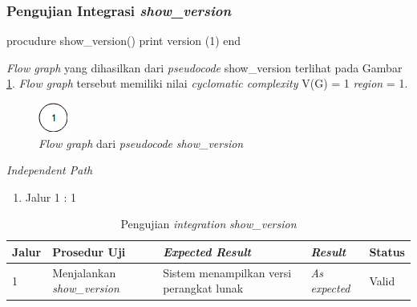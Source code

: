 \subsubsection{Pengujian Integrasi \emph{show\_version}}

\begin{code}
\begin{ignasicblock}[title=show\_version,minted language=text]
procudure show_version()
    print version         (1)
end
\end{ignasicblock}
  \label{pc:show_version}
\end{code}

\par\null\par
\noindent
\emph{Flow graph} yang dihasilkan dari \emph{pseudocode}
show\_version terlihat pada Gambar \ref{cfg:show_version}.
\emph{Flow graph} tersebut memiliki nilai \emph{cyclomatic complexity} V(G) = 1 \emph{region} = 1.

\begin{figure}[H]
  \centering
  \includegraphics[width=.06\linewidth]{img/test-case/1node}
  \caption{\emph{Flow graph} dari \emph{pseudocode} \emph{show\_version}}
  \label{cfg:show_version}
\end{figure}

\noindent
\emph{Independent Path}

\begin{enumerate}
\item Jalur 1 : 1
\end{enumerate}

\newpage

\begin{longtable}{|P{.06\textwidth}|P{.30\textwidth}|P{.30\textwidth}|P{.10\textwidth}|P{.08\textwidth}|}
  \caption{Pengujian \emph{integration} \emph{show\_version}} \label{jalur:show_version}\\
  \hline
  \textbf{Jalur} & \textbf{Prosedur Uji} & \textbf{\emph{Expected Result}}
  & \textbf{\emph{Result}} & \textbf{Status} \\\hline
  1 & Menjalankan \emph{show\_version} & Sistem menampilkan versi perangkat lunak & \emph{As expected} & Valid \\\hline
\end{longtable}

